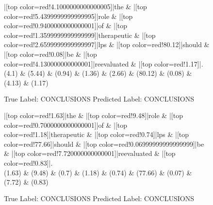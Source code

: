 \documentclass[a4paper, landscape]{article}
\begin{document}
\clearpage
\begin{figure}
\begin{center}
\begin{dependency}
\begin{deptext}
|[top color=red!4.1000000000000005]|the \& |[top color=red!5.4399999999999995]|role \& |[top color=red!0.9400000000000001]|of \& |[top color=red!1.3599999999999999]|therapeutic \& |[top color=red!2.6599999999999997]|lps \& |[top color=red!80.12]|should \& |[top color=red!0.08]|be \& |[top color=red!4.130000000000001]|reevaluated \& |[top color=red!1.17]|.\\
(4.1) \& (5.44) \& (0.94) \& (1.36) \& (2.66) \& (80.12) \& (0.08) \& (4.13) \& (1.17)\\
\end{deptext}
\end{dependency}
\end{center}
\caption{True Label: CONCLUSIONS Predicted Label: CONCLUSIONS}
\end{figure}
\clearpage
\begin{figure}
\begin{center}
\begin{dependency}
\begin{deptext}
|[top color=red!1.63]|the \& |[top color=red!9.48]|role \& |[top color=red!0.7000000000000001]|of \& |[top color=red!1.18]|therapeutic \& |[top color=red!0.74]|lps \& |[top color=red!77.66]|should \& |[top color=red!0.06999999999999999]|be \& |[top color=red!7.720000000000001]|reevaluated \& |[top color=red!0.83]|.\\
(1.63) \& (9.48) \& (0.7) \& (1.18) \& (0.74) \& (77.66) \& (0.07) \& (7.72) \& (0.83)\\
\end{deptext}
\end{dependency}
\end{center}
\caption{True Label: CONCLUSIONS Predicted Label: CONCLUSIONS}
\end{figure}
\end{document}
